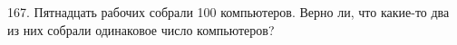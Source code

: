 167. Пятнадцать рабочих собрали 100 компьютеров. Верно ли, что какие-то два из них собрали одинаковое число компьютеров?\\
